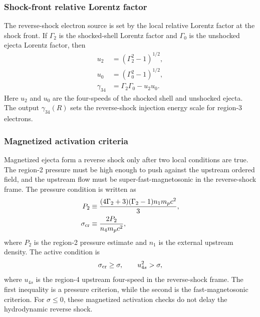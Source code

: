 \documentclass[twocolumn]{aastex702}
\begin{document}
\subsubsection{Shock-front relative Lorentz factor}

The reverse-shock electron source is set by the local relative Lorentz factor at
the shock front.  If \(\Gamma_2\) is the shocked-shell Lorentz factor and
\(\Gamma_0\) is the unshocked ejecta Lorentz factor, then
\begin{equation}
\begin{aligned}
u_2&=(\Gamma_2^2-1)^{1/2},\\
u_0&=(\Gamma_0^2-1)^{1/2},\\
\gamma_{34}&=\Gamma_2\Gamma_0-u_2u_0.
\end{aligned}
\end{equation}
Here \(u_2\) and \(u_0\) are the four-speeds of the shocked shell and unshocked
ejecta.  The output \(\gamma_{34}(R)\) sets the reverse-shock injection energy
scale for region-3 electrons.

\subsubsection{Magnetized activation criteria}

Magnetized ejecta form a reverse shock only after two local conditions are true.
The region-2 pressure must be high enough to push against the upstream ordered
field, and the upstream flow must be super-fast-magnetosonic in the
reverse-shock frame.  The pressure condition is written as
\begin{equation}
\begin{aligned}
P_2&\equiv
\frac{(4\Gamma_2+3)(\Gamma_2-1)n_1m_pc^2}{3},\\
\sigma_{\rm cr}&\equiv \frac{2P_2}{n_4m_pc^2},
\end{aligned}
\end{equation}
where \(P_2\) is the region-2 pressure estimate and \(n_1\) is the external
upstream density.  The active condition is
\begin{equation}
\sigma_{\rm cr}\ge\sigma,\qquad u_{4s}^2>\sigma ,
\end{equation}
where \(u_{4s}\) is the region-4 upstream four-speed in the reverse-shock frame.
The first inequality is a pressure criterion, while the second is the
fast-magnetosonic criterion.  For \(\sigma\le0\), these magnetized activation
checks do not delay the hydrodynamic reverse shock.
\end{document}
